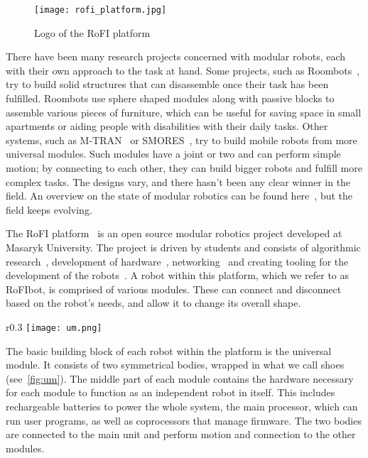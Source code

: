 \begin{figure}
    \centering
    \texttt{[image: rofi\_platform.jpg]}
  \caption{Logo of the RoFI platform~\cite{rofiPlatform}}
\end{figure}

There have been many research projects concerned with modular robots, each with their own approach to the task at hand. Some projects, such as Roombots~\cite{sprowitz_roombots_2010}, try to build solid structures that can disassemble once their task has been fulfilled. Roombots use sphere shaped modules along with passive blocks to assemble various pieces of furniture, which can be useful for saving space in small apartments or aiding people with disabilities with their daily tasks. Other systems, such as M-TRAN~\cite{mtran} or SMORES~\cite{smores}, try to build mobile robots from more universal modules. Such modules have a joint or two and can perform simple motion; by connecting to each other, they can build bigger robots and fulfill more complex tasks. The designs vary, and there hasn't been any clear winner in the field. An overview on the state of modular robotics can be found here~\cite{modular_survey}, but the field keeps evolving.

The RoFI platform~\cite{Mrázek2019thesis} is an open source modular robotics project developed at Masaryk University. The project is driven by students and consists of algorithmic research~\cite{Vozárová2019thesis, Zacek2021thesis, Nausova2022thesis, Ondika2021thesis, SMTReconfig}, development of hardware~\cite{Mrázek2019thesis, RoFICoM}, networking~\cite{Chlup2020thesis, Chlup2023thesis} and creating tooling for the development of the robots~\cite{Naušová2019thesis, Svoboda2020thesis}.
A robot within this platform, which we refer to as RoFIbot, is comprised of various modules. These can connect and disconnect based on the robot's needs, and allow it to change its overall shape.

\begin{wrapfigure}{r}{0.3\textwidth}
    \centering
    \texttt{[image: um.png]}
  \caption{Build of the universal module~\cite{rofiUm}}\label{fig:um}
\end{wrapfigure}

The basic building block of each robot within the platform is the universal module. It consists of two symmetrical bodies, wrapped in what we call shoes (see~\ref{fig:um}). The middle part of each module contains the hardware necessary for each module to function as an independent robot in itself. This includes rechargeable batteries to power the whole system, the main processor, which can run user programs, as well as coprocessors that manage firmware. The two bodies are connected to the main unit and perform motion and connection to the other modules.

